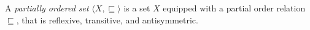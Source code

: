 A \emph{partially ordered set} $\langle X, \sqsubseteq \rangle$ is a set $X$ equipped with a partial order relation $\sqsubseteq$, that is reflexive, transitive, and antisymmetric.
